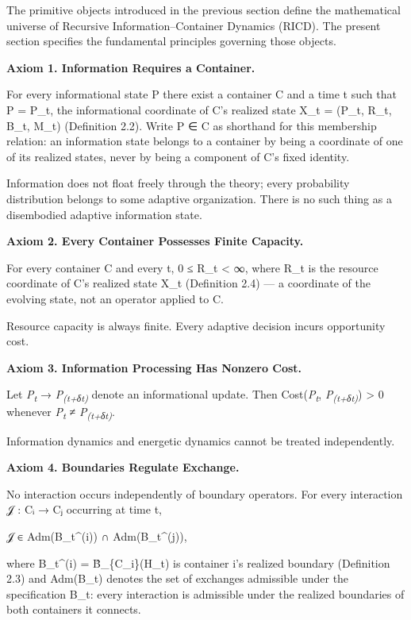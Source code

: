 \documentclass[
]{article}
\begin{document}
The primitive objects introduced in the previous section define the
mathematical universe of Recursive Information--Container Dynamics
(RICD). The present section specifies the fundamental principles
governing those objects.

\textbf{Axiom 1. Information Requires a Container.}

For every informational state P there exist a container C and a time t
such that P = P\_t, the informational coordinate of C's realized state
X\_t = (P\_t, R\_t, B\_t, M\_t) (Definition 2.2). Write P ∈ C as
shorthand for this membership relation: an information state belongs to
a container by being a coordinate of one of its realized states, never
by being a component of C's fixed identity.

Information does not float freely through the theory; every probability
distribution belongs to some adaptive organization. There is no such
thing as a disembodied adaptive information state.

\textbf{Axiom 2. Every Container Possesses Finite Capacity.}

For every container C and every t, 0 ≤ R\_t \textless{} ∞, where R\_t is
the resource coordinate of C's realized state X\_t (Definition 2.4) ---
a coordinate of the evolving state, not an operator applied to C.

Resource capacity is always finite. Every adaptive decision incurs
opportunity cost.

\textbf{Axiom 3. Information Processing Has Nonzero Cost.}

Let \emph{P\textsubscript{t}} → \emph{P\textsubscript{(t+δt)}} denote an
informational update. Then Cost(\emph{P\textsubscript{t}},
\emph{P\textsubscript{(t+δt)}}) \textgreater{} 0 whenever
\emph{P\textsubscript{t}} ≠ \emph{P\textsubscript{(t+δt)}}.

Information dynamics and energetic dynamics cannot be treated
independently.

\textbf{Axiom 4. Boundaries Regulate Exchange.}

No interaction occurs independently of boundary operators. For every
interaction 𝒥 : Cᵢ → Cⱼ occurring at time t,

𝒥 ∈ Adm(B\_t\^{}(i)) ∩ Adm(B\_t\^{}(j)),

where B\_t\^{}(i) = B̂\_\{C\_i\}(H\_t) is container i's realized boundary
(Definition 2.3) and Adm(B\_t) denotes the set of exchanges admissible
under the specification B\_t: every interaction is admissible under the
realized boundaries of both containers it connects.
\end{document}
